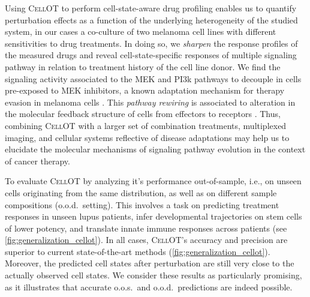 \smallskip

Using \textsc{CellOT} to perform cell-state-aware drug profiling enables us to quantify perturbation effects as a function of the underlying heterogeneity of the studied system, in our cases a co-culture of two melanoma cell lines with different sensitivities to drug treatments. In doing so, we \textit{sharpen} the response profiles of the measured drugs and reveal cell-state-specific responses of multiple signaling pathway in relation to treatment history of the cell line donor. We find the signaling activity associated to the MEK and PI3k pathways to decouple in cells pre-exposed to MEK inhibitors, a known adaptation mechanism for therapy evasion in melanoma cells \citep{kun2021mek}. This \textit{pathway rewiring} is associated to alteration in the molecular feedback structure of cells from effectors to receptors \citep{kun2021mek, turke2012mek}. Thus, combining \textsc{CellOT} with a larger set of combination treatments, multiplexed imaging, and cellular systems reflective of disease adaptations may help us to elucidate the molecular mechanisms of signaling pathway evolution in the context of cancer therapy. 

\smallskip
To evaluate \textsc{CellOT} by analyzing it's performance out-of-sample, i.e., on unseen cells originating from the same distribution, as well as on different sample compositions (o.o.d.~setting). 
This involves a task on predicting treatment responses in unseen lupus patients, infer developmental trajectories on stem cells of lower potency, and translate innate immune responses across patients (see \cref{fig:generalization_cellot}). 
In all cases, \textsc{CellOT}'s accuracy and precision are superior to current state-of-the-art methods (\cref{fig:generalization_cellot}). Moreover, the predicted cell states after perturbation are still very close to the actually observed cell states. We consider these results as particularly promising, as it illustrates that accurate o.o.s.~and o.o.d.~predictions are indeed possible.

\smallskip

